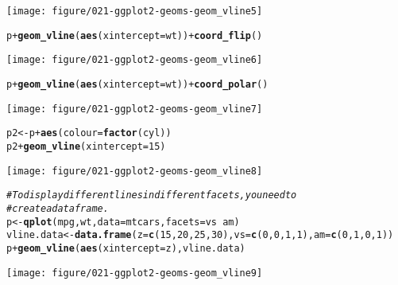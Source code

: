 \documentclass[a4paper,titlepage]{tufte-handout}\usepackage[]{graphicx}\usepackage[]{color}
\makeatletter
\def\maxwidth{ %
  \ifdim\Gin@nat@width>\linewidth
    \linewidth
  \else
    \Gin@nat@width
  \fi
}
\newcommand{\hlnum}[1]{\textcolor[rgb]{0.686,0.059,0.569}{#1}}%
\newcommand{\hlcom}[1]{\textcolor[rgb]{0.678,0.584,0.686}{\textit{#1}}}%
\newcommand{\hlopt}[1]{\textcolor[rgb]{0,0,0}{#1}}%
\newcommand{\hlstd}[1]{\textcolor[rgb]{0.345,0.345,0.345}{#1}}%
\newcommand{\hlkwb}[1]{\textcolor[rgb]{0.69,0.353,0.396}{#1}}%
\newcommand{\hlkwc}[1]{\textcolor[rgb]{0.333,0.667,0.333}{#1}}%
\newcommand{\hlkwd}[1]{\textcolor[rgb]{0.737,0.353,0.396}{\textbf{#1}}}%
\newenvironment{kframe}{%
 \def\at@end@of@kframe{}%
 \ifinner\ifhmode%
  \def\at@end@of@kframe{\end{minipage}}%
  \begin{minipage}{\columnwidth}%
 \fi\fi%
 \def\FrameCommand##1{\hskip\@totalleftmargin \hskip-\fboxsep
 \colorbox{shadecolor}{##1}\hskip-\fboxsep
     \hskip-\linewidth \hskip-\@totalleftmargin \hskip\columnwidth}%
 \MakeFramed {\advance\hsize-\width
   \@totalleftmargin\z@ \linewidth\hsize
   \@setminipage}}%
 {\par\unskip\endMakeFramed%
 \at@end@of@kframe}
\newenvironment{knitrout}{}{} %
\makeatother
\begin{document}
\begin{knitrout}
\begin{kframe}
\begin{alltt}
\end{alltt}
\end{kframe}
\texttt{[image: figure/021-ggplot2-geoms-geom\_vline5]} 
\begin{kframe}\begin{alltt}
\hlstd{p} \hlopt{+} \hlkwd{geom_vline}\hlstd{(}\hlkwd{aes}\hlstd{(}\hlkwc{xintercept} \hlstd{= wt))} \hlopt{+} \hlkwd{coord_flip}\hlstd{()}
\end{alltt}
\end{kframe}
\texttt{[image: figure/021-ggplot2-geoms-geom\_vline6]} 
\begin{kframe}\begin{alltt}
\hlstd{p} \hlopt{+} \hlkwd{geom_vline}\hlstd{(}\hlkwd{aes}\hlstd{(}\hlkwc{xintercept} \hlstd{= wt))} \hlopt{+} \hlkwd{coord_polar}\hlstd{()}
\end{alltt}
\end{kframe}
\texttt{[image: figure/021-ggplot2-geoms-geom\_vline7]} 
\begin{kframe}\begin{alltt}
\hlstd{p2} \hlkwb{<-} \hlstd{p} \hlopt{+} \hlkwd{aes}\hlstd{(}\hlkwc{colour} \hlstd{=} \hlkwd{factor}\hlstd{(cyl))}
\hlstd{p2} \hlopt{+} \hlkwd{geom_vline}\hlstd{(}\hlkwc{xintercept} \hlstd{=} \hlnum{15}\hlstd{)}
\end{alltt}
\end{kframe}
\texttt{[image: figure/021-ggplot2-geoms-geom\_vline8]} 
\begin{kframe}\begin{alltt}
\hlcom{# To display different lines in different facets, you need to}
\hlcom{# create a data frame.}
\hlstd{p} \hlkwb{<-} \hlkwd{qplot}\hlstd{(mpg, wt,} \hlkwc{data}\hlstd{=mtcars,} \hlkwc{facets} \hlstd{= vs} \hlopt{~} \hlstd{am)}
\hlstd{vline.data} \hlkwb{<-} \hlkwd{data.frame}\hlstd{(}\hlkwc{z} \hlstd{=} \hlkwd{c}\hlstd{(}\hlnum{15}\hlstd{,} \hlnum{20}\hlstd{,} \hlnum{25}\hlstd{,} \hlnum{30}\hlstd{),} \hlkwc{vs} \hlstd{=} \hlkwd{c}\hlstd{(}\hlnum{0}\hlstd{,} \hlnum{0}\hlstd{,} \hlnum{1}\hlstd{,} \hlnum{1}\hlstd{),} \hlkwc{am} \hlstd{=} \hlkwd{c}\hlstd{(}\hlnum{0}\hlstd{,} \hlnum{1}\hlstd{,} \hlnum{0}\hlstd{,} \hlnum{1}\hlstd{))}
\hlstd{p} \hlopt{+} \hlkwd{geom_vline}\hlstd{(}\hlkwd{aes}\hlstd{(}\hlkwc{xintercept} \hlstd{= z), vline.data)}
\end{alltt}
\end{kframe}
\texttt{[image: figure/021-ggplot2-geoms-geom\_vline9]} 
\begin{kframe}\begin{alltt}


\end{alltt}
\end{kframe}
\end{knitrout}
\end{document}

